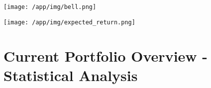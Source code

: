 \documentclass{article}
\begin{document}
\vspace{.4cm}
\begin{center}
\hspace*{-1cm}\texttt{[image: /app/img/bell.png]}\par

\vspace{.5cm}

\hspace*{-1cm}\texttt{[image: /app/img/expected\_return.png]}\par
\end{center}

\newpage

\section{Current Portfolio Overview - Statistical Analysis}

\vspace{1.5cm}

\end{document}
